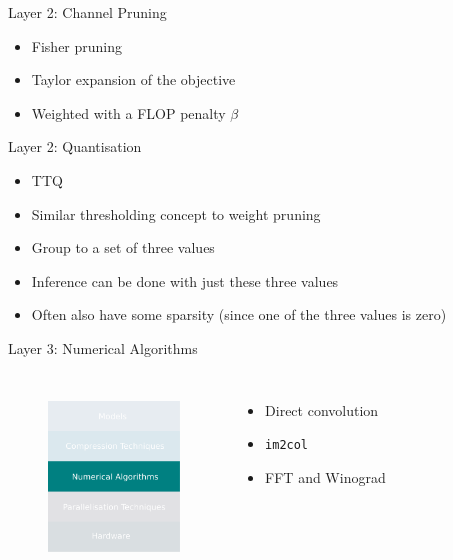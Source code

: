 \documentclass[xcolor=dvipsnames]{beamer}
\begin{document}
\begin{frame}{Layer 2: Channel Pruning}
    
\begin{itemize}
    \item Fisher pruning
    \item Taylor expansion of the objective
    \item Weighted with a FLOP penalty $\beta$
\end{itemize}
    
\end{frame}


\begin{frame}{Layer 2: Quantisation}
\begin{itemize}
    \item TTQ
    \item Similar thresholding concept to weight pruning
    \item Group to a set of three values 
    \item Inference can be done with just these three values
    \item Often also have some sparsity (since one of the three values is zero)
\end{itemize}
    
\end{frame}


\begin{frame}{Layer 3: Numerical Algorithms}

\begin{columns}

\begin{figure}
    \centering
    \includegraphics[width=3.5cm]{images/numericals.pdf}
    \label{fig:inference-stack-nums-1}
\end{figure}


\begin{itemize}
    \item Direct convolution
    \item \texttt{im2col}
    \item FFT and Winograd
\end{itemize}

\end{columns}
\end{frame}
\end{document}
